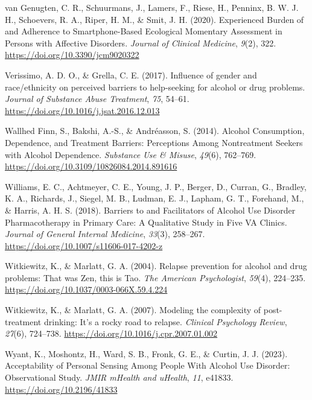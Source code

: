 \documentclass[
  letterpaper,
  DIV=11,
  numbers=noendperiod]{scrartcl}
\newlength{\cslhangindent}
\newenvironment{CSLReferences}[2] %
 {\begin{list}{}{%
  \setlength{\itemindent}{0pt}
  \setlength{\leftmargin}{0pt}
  \setlength{\parsep}{0pt}
  \ifodd #1
   \setlength{\leftmargin}{\cslhangindent}
   \setlength{\itemindent}{-1\cslhangindent}
  \fi
  \setlength{\itemsep}{#2\baselineskip}}}
 {\end{list}}
\begin{document}
\begin{CSLReferences}{1}{0}
van Genugten, C. R., Schuurmans, J., Lamers, F., Riese, H., Penninx, B.
W. J. H., Schoevers, R. A., Riper, H. M., \& Smit, J. H. (2020).
Experienced {Burden} of and {Adherence} to {Smartphone-Based Ecological
Momentary Assessment} in {Persons} with {Affective Disorders}.
\emph{Journal of Clinical Medicine}, \emph{9}(2), 322.
\url{https://doi.org/10.3390/jcm9020322}

Verissimo, A. D. O., \& Grella, C. E. (2017). Influence of gender and
race/ethnicity on perceived barriers to help-seeking for alcohol or drug
problems. \emph{Journal of Substance Abuse Treatment}, \emph{75},
54--61. \url{https://doi.org/10.1016/j.jsat.2016.12.013}

Wallhed Finn, S., Bakshi, A.-S., \& Andréasson, S. (2014). Alcohol
{Consumption}, {Dependence}, and {Treatment Barriers}: {Perceptions
Among Nontreatment Seekers} with {Alcohol Dependence}. \emph{Substance
Use \& Misuse}, \emph{49}(6), 762--769.
\url{https://doi.org/10.3109/10826084.2014.891616}

Williams, E. C., Achtmeyer, C. E., Young, J. P., Berger, D., Curran, G.,
Bradley, K. A., Richards, J., Siegel, M. B., Ludman, E. J., Lapham, G.
T., Forehand, M., \& Harris, A. H. S. (2018). Barriers to and
{Facilitators} of {Alcohol Use Disorder Pharmacotherapy} in {Primary
Care}: {A Qualitative Study} in {Five VA Clinics}. \emph{Journal of
General Internal Medicine}, \emph{33}(3), 258--267.
\url{https://doi.org/10.1007/s11606-017-4202-z}

Witkiewitz, K., \& Marlatt, G. A. (2004). Relapse prevention for alcohol
and drug problems: That was {Zen}, this is {Tao}. \emph{The American
Psychologist}, \emph{59}(4), 224--235.
\url{https://doi.org/10.1037/0003-066X.59.4.224}

Witkiewitz, K., \& Marlatt, G. A. (2007). Modeling the complexity of
post-treatment drinking: {It}'s a rocky road to relapse. \emph{Clinical
Psychology Review}, \emph{27}(6), 724--738.
\url{https://doi.org/10.1016/j.cpr.2007.01.002}

Wyant, K., Moshontz, H., Ward, S. B., Fronk, G. E., \& Curtin, J. J.
(2023). Acceptability of {Personal Sensing Among People With Alcohol Use
Disorder}: {Observational Study}. \emph{JMIR mHealth and uHealth},
\emph{11}, e41833. \url{https://doi.org/10.2196/41833}


\end{CSLReferences}
\end{document}
